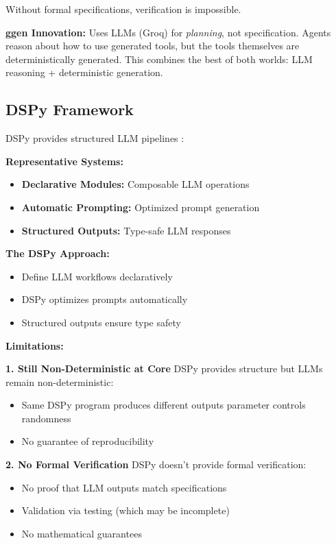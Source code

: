 Without formal specifications, verification is impossible.

\textbf{ggen Innovation:} Uses LLMs (Groq) for \textit{planning}, not specification. Agents reason about how to use generated tools, but the tools themselves are deterministically generated. This combines the best of both worlds: LLM reasoning + deterministic generation.

\subsection{DSPy Framework}

DSPy provides structured LLM pipelines \cite{dspy2023}:

\textbf{Representative Systems:}
\begin{itemize}
    \item \textbf{Declarative Modules:} Composable LLM operations
    \item \textbf{Automatic Prompting:} Optimized prompt generation
    \item \textbf{Structured Outputs:} Type-safe LLM responses
\end{itemize}

\textbf{The DSPy Approach:}
\begin{itemize}
    \item Define LLM workflows declaratively
    \item DSPy optimizes prompts automatically
    \item Structured outputs ensure type safety
\end{itemize}

\textbf{Limitations:}

\textbf{1. Still Non-Deterministic at Core}
DSPy provides structure but LLMs remain non-deterministic:
\begin{itemize}
    \item Same DSPy program produces different outputs
    \temperature parameter controls randomness
    \item No guarantee of reproducibility
\end{itemize}

\textbf{2. No Formal Verification}
DSPy doesn't provide formal verification:
\begin{itemize}
    \item No proof that LLM outputs match specifications
    \item Validation via testing (which may be incomplete)
    \item No mathematical guarantees
\end{itemize}

